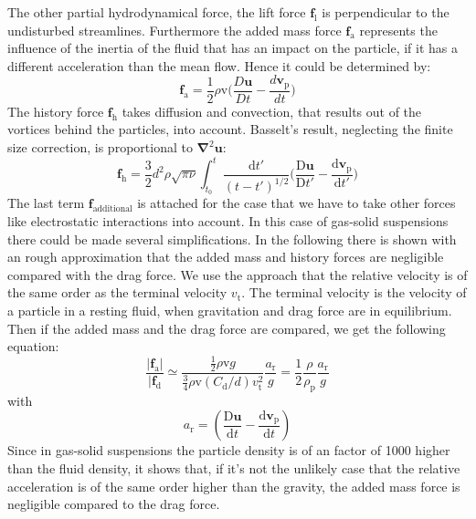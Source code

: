 \documentclass[11pt,a4paper,openany,oneside,parskip=half*]{article}
\renewcommand*\vec[1]{\boldsymbol{#1}}
\begin{document}
The other partial hydrodynamical force, the lift force $\vec{f}_\mathrm{l}$ is perpendicular to the undisturbed streamlines.
Furthermore the added mass force $\vec{f}_\mathrm{a}$ represents the influence of the inertia of the fluid that has an impact on the particle, if it has a different acceleration than the mean flow.
Hence it could be determined by:
\begin{equation}
\vec{f}_\mathrm{a} =  \frac{1}{2}\rho \mathrm{v} \biggl(\frac{D\vec{u}}{Dt}-\frac{d\vec{v}_\mathrm{p}}{dt}\biggl)
\end{equation}
The history force $\vec{f}_\mathrm{h}$ takes diffusion and convection, that results out of the vortices behind the particles, into account. Basselt's result, neglecting the finite size correction, is proportional to $\vec\nabla^\mathrm{2}\vec{u}$:
\begin{equation}
\vec{f}_\mathrm{h} = \frac{3}{2}d^\mathrm{2}\rho\sqrt{\pi\nu}\int_{t_\mathrm{0}}^{t} \frac{\mathrm{d}t'}{(t-t')^\mathrm{1/2}} \biggl(\frac{\mathrm{D}\vec{u}}{\mathrm{D}t'}- \frac{\mathrm{d}\vec{v}_\mathrm{p}}{\mathrm{d}t'}\biggl)  
\end{equation}
The last term $\vec{f}_\mathrm{additional}$ is attached for the case that we have to take other forces like electrostatic interactions into account.
In this case of gas-solid suspensions there could be made several simplifications.
In the following there is shown with an rough approximation that the added mass and history forces are negligible compared with the drag force.
We use the approach that the relative velocity is of the same order as the terminal velocity $v_\mathrm{t}$. The terminal velocity is the velocity of a particle in a resting fluid, when gravitation and drag force are in equilibrium. Then if the added mass and the drag force are compared, we get the following equation:
\begin{equation}
\frac{|\vec{f}_\mathrm{a}|}{|\vec{f}_\mathrm{d}} \simeq \frac{\frac{1}{2} \rho \mathrm{v} g}{\frac{3}{4} \rho \mathrm{v}(C_\mathrm{d}/d) v_\mathrm{t}^\mathrm{2}}\frac{a_\mathrm{r}}{g} = \frac{1}{2}\frac{\rho}{\rho_\mathrm{p}}\frac{a_\mathrm{r}}{g}
\end{equation}
with 
\begin{equation}
a_\mathrm{r}=(\frac{\mathrm{D}\vec{u}}{\mathrm{d}t}-\frac{\mathrm{d}\vec{v}_\mathrm{p}}{\mathrm{d}t})
\end{equation}
Since in gas-solid suspensions the particle density is of an factor of 1000 higher than the fluid density, it shows that, if it's not the unlikely case that the relative acceleration is of the same order higher than the gravity, the added mass force is negligible compared to the drag force.
\end{document}
